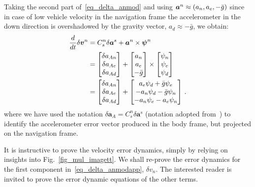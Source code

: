 \documentclass[journal]{IEEEtran}
\begin{document}
Taking the second part of~\eqref{eq_delta_anmod} and using $\boldsymbol{a}^n \approx (a_n, a_e, -\Bar{{g}})$ since in case of low vehicle velocity in the navigation frame the accelerometer in the down direction is overshadowed by the gravity vector, $a_d\approx -\bar g$, we obtain:
\begin{equation}\label{eq_delta_anmodapp}
\begin{split}
    \frac{d}{dt}\delta \boldsymbol{v}^n&= C_{s}^{n} \delta \boldsymbol{a}^s +\boldsymbol{a}^{n}\times\boldsymbol{\psi}^n\\
      &=\begin{bmatrix}
      \delta{a}_{An}\\
     \delta{a}_{Ae}\\
      \delta{a}_{Ad}
      \end{bmatrix} +\begin{bmatrix}
     a_n\\
      a_e\\
      -\Bar{{g}}
      \end{bmatrix}
      \times\begin{bmatrix}
 {{\psi}}_n \\
  {{\psi}}_e\\
   {{\psi}}_d
\end{bmatrix}\\
&=\begin{bmatrix}
      \delta{a}_{An}\\
     \delta{a}_{Ae}\\
      \delta{a}_{Ad}
      \end{bmatrix} +\begin{bmatrix}
     a_e{{\psi}}_d+\Bar{g}{{\psi}}_e\\
      -a_n{{\psi}}_d-\Bar{g}{{\psi}}_n\\
      -a_n{{\psi}}_e-a_e{{\psi}}_n
      \end{bmatrix}\,.
    \end{split}
\end{equation}
where we have used the notation $ \delta \boldsymbol{a}_A=C_{s}^{n} \delta \boldsymbol{a}^s$ (notation adopted from~\cite{2004applied}) to identify the accelerometer error vector produced in the body frame, but projected on the navigation frame.\par
It is instructive to prove the  velocity error dynamics, simply by relying on insights into Fig.~\ref{fig_mul_imagett}. We shall  re-prove the error dynamics for the first component in~\eqref{eq_delta_anmodapp}, $\delta v_n$. The interested reader is invited to prove the error dynamic equations of the  other terms.
\end{document}

